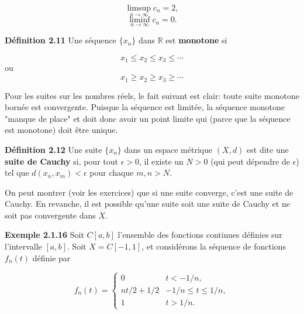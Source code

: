 \documentclass[10pt,twoside,a4paper]{book}
\begin{document}
\begin{equation*}
  \limsup_{n \longrightarrow \infty} c_n = 2,
\end{equation*}
\begin{equation*}
  \liminf_{n \longrightarrow \infty} c_n = 0.
\end{equation*}

\vspace{4mm}
\noindent
\textbf{Définition 2.11} Une séquence $\{x_n\}$ dans $\mathbb{R}$ est \textbf{monotone} si

\begin{equation*}
  x_1 \leq x_2 \leq x_3 \leq \cdots
\end{equation*}
\noindent
ou
\begin{equation*}
  x_1 \geq x_2 \geq x_3 \geq \cdots
\end{equation*}

Pour les suites sur les nombres réels, le fait suivant est clair: toute suite monotone bornée est convergente. Puisque la séquence est limitée, la séquence monotone "manque de place" et doit donc avoir un point limite qui (parce que la séquence est monotone) doit être unique.

\vspace{4mm}
\noindent
\textbf{Définition 2.12} Une suite $\{x_n\}$ dans un espace métrique $(X, d)$ est dite une \textbf{suite de Cauchy} si, pour tout $\epsilon > 0$, il existe un $N > 0$ (qui peut dépendre de $\epsilon$) tel que $d(x_n, x_m) < \epsilon$ pour chaque $m, n > N$.

\vspace{2mm}
On peut montrer (voir les exercices) que si une suite converge, c'est une suite de Cauchy. En revanche, il est possible qu'une suite soit une suite de Cauchy et ne soit pas convergente dans $X$.

\vspace{4mm}
\noindent
\textbf{Exemple 2.1.16} Soit $C[a, b]$ l'ensemble des fonctions continues définies sur l'intervalle $[a, b]$. Soit $X = C[-1, 1]$, et considérons la séquence de fonctions $f_n(t)$ définie par

\begin{equation}
  f_n(t) = \begin{cases} 0 & t < -1/n, \\
    nt/2 + 1/2 & -1/n \leq t \leq 1/n, \\
    1 & t > 1/n.
        \end{cases}
\end{equation}
\end{document}
